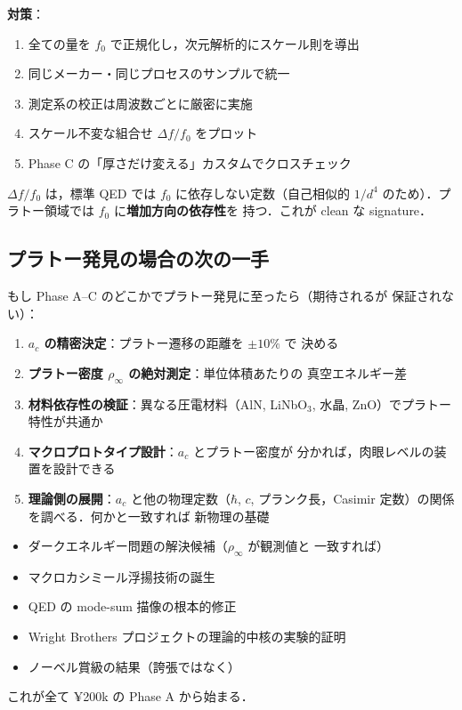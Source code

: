\documentclass[11pt,a4paper]{article}
\begin{document}
\textbf{対策}：
\begin{enumerate}
\item 全ての量を $f_0$ で正規化し，次元解析的にスケール則を導出
\item 同じメーカー・同じプロセスのサンプルで統一
\item 測定系の校正は周波数ごとに厳密に実施
\item スケール不変な組合せ $\Delta f / f_0$ をプロット
\item Phase C の「厚さだけ変える」カスタムでクロスチェック
\end{enumerate}

$\Delta f/f_0$ は，標準 QED では $f_0$ に依存しない定数（自己相似的
$1/d^4$ のため）．プラトー領域では $f_0$ に\textbf{増加方向の依存性}を
持つ．これが clean な signature．

\subsection{プラトー発見の場合の次の一手}

もし Phase A--C のどこかでプラトー発見に至ったら（期待されるが
保証されない）：

\begin{enumerate}
\item \textbf{$a_c$ の精密決定}：プラトー遷移の距離を $\pm 10\%$ で
決める
\item \textbf{プラトー密度 $\rho_\infty$ の絶対測定}：単位体積あたりの
真空エネルギー差
\item \textbf{材料依存性の検証}：異なる圧電材料（AlN, LiNbO$_3$,
水晶, ZnO）でプラトー特性が共通か
\item \textbf{マクロプロトタイプ設計}：$a_c$ とプラトー密度が
分かれば，肉眼レベルの装置を設計できる
\item \textbf{理論側の展開}：$a_c$ と他の物理定数（$\hbar$, $c$,
プランク長，Casimir 定数）の関係を調べる．何かと一致すれば
新物理の基礎
\end{enumerate}

\begin{tcolorbox}[colback=green!5,colframe=green!60!black,title=プラトー発見が意味するもの]
\begin{itemize}
\item ダークエネルギー問題の解決候補（$\rho_\infty$ が観測値と
一致すれば）
\item マクロカシミール浮揚技術の誕生
\item QED の mode-sum 描像の根本的修正
\item Wright Brothers プロジェクトの理論的中核の実験的証明
\item ノーベル賞級の結果（誇張ではなく）
\end{itemize}
これが全て ¥200k の Phase A から始まる．
\end{tcolorbox}
\end{document}
